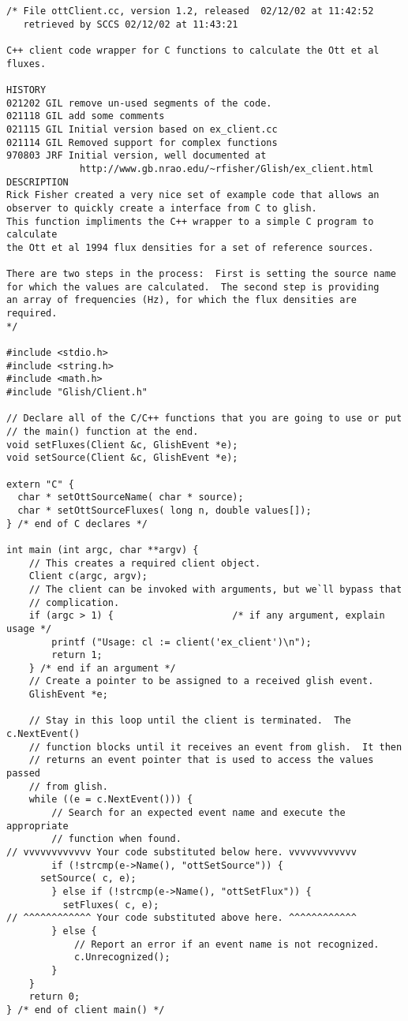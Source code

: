 \begin{verbatim}
/* File ottClient.cc, version 1.2, released  02/12/02 at 11:42:52 
   retrieved by SCCS 02/12/02 at 11:43:21     

C++ client code wrapper for C functions to calculate the Ott et al fluxes.

HISTORY 
021202 GIL remove un-used segments of the code.
021118 GIL add some comments
021115 GIL Initial version based on ex_client.cc
021114 GIL Removed support for complex functions
970803 JRF Initial version, well documented at 
             http://www.gb.nrao.edu/~rfisher/Glish/ex_client.html
DESCRIPTION
Rick Fisher created a very nice set of example code that allows an
observer to quickly create a interface from C to glish.
This function impliments the C++ wrapper to a simple C program to calculate
the Ott et al 1994 flux densities for a set of reference sources.

There are two steps in the process:  First is setting the source name
for which the values are calculated.  The second step is providing
an array of frequencies (Hz), for which the flux densities are required.
*/

#include <stdio.h>
#include <string.h>
#include <math.h>
#include "Glish/Client.h"

// Declare all of the C/C++ functions that you are going to use or put
// the main() function at the end.
void setFluxes(Client &c, GlishEvent *e);
void setSource(Client &c, GlishEvent *e);

extern "C" {
  char * setOttSourceName( char * source);
  char * setOttSourceFluxes( long n, double values[]);
} /* end of C declares */

int main (int argc, char **argv) {
    // This creates a required client object.
    Client c(argc, argv);
    // The client can be invoked with arguments, but we`ll bypass that
    // complication.
    if (argc > 1) {                     /* if any argument, explain usage */
        printf ("Usage: cl := client('ex_client')\n");
        return 1;
    } /* end if an argument */
    // Create a pointer to be assigned to a received glish event.
    GlishEvent *e;

    // Stay in this loop until the client is terminated.  The c.NextEvent()
    // function blocks until it receives an event from glish.  It then
    // returns an event pointer that is used to access the values passed
    // from glish.
    while ((e = c.NextEvent())) {
        // Search for an expected event name and execute the appropriate
        // function when found.
// vvvvvvvvvvvv Your code substituted below here. vvvvvvvvvvvv
        if (!strcmp(e->Name(), "ottSetSource")) {
	  setSource( c, e);
        } else if (!strcmp(e->Name(), "ottSetFlux")) {
          setFluxes( c, e);
// ^^^^^^^^^^^^ Your code substituted above here. ^^^^^^^^^^^^
        } else {
            // Report an error if an event name is not recognized.
            c.Unrecognized();
        }
    }
    return 0;
} /* end of client main() */


\end{verbatim}
